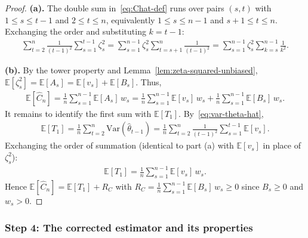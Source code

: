 \documentclass[11pt]{article}
\newcommand{\thetahat}{\hat{\theta}}
\newcommand{\Chat}{\hat{C}}
\newcommand{\Var}{\mathrm{Var}}
\begin{document}
\begin{proof}
    \textbf{(a).} The double sum in~\eqref{eq:Chat-def} runs over pairs $(s,t)$ with $1 \leq s \leq t-1$ and $2 \leq t \leq n$, equivalently $1 \leq s \leq n-1$ and $s+1 \leq t \leq n$. Exchanging the order and substituting $k = t-1$:
    \begin{align*}
        \sum_{t=2}^n \frac{1}{(t-1)^2}\sum_{s=1}^{t-1}\zeta_s^2 = \sum_{s=1}^{n-1}\zeta_s^2 \sum_{t=s+1}^{n}\frac{1}{(t-1)^2} = \sum_{s=1}^{n-1}\zeta_s^2 \sum_{k=s}^{n-1}\frac{1}{k^2}.
    \end{align*}

    \textbf{(b).} By the tower property and Lemma~\ref{lem:zeta-squared-unbiased}, $\mathbb{E}[\zeta_s^2] = \mathbb{E}[A_s] = \mathbb{E}[v_s] + \mathbb{E}[B_s]$. Thus,
    \begin{align*}
        \mathbb{E}[\Chat_n] = \frac{1}{n}\sum_{s=1}^{n-1}\mathbb{E}[A_s]\,w_s = \frac{1}{n}\sum_{s=1}^{n-1}\mathbb{E}[v_s]\,w_s + \frac{1}{n}\sum_{s=1}^{n-1}\mathbb{E}[B_s]\,w_s.
    \end{align*}
    It remains to identify the first sum with $\mathbb{E}[T_1]$. By~\eqref{eq:var-theta-hat},
    \begin{align*}
        \mathbb{E}[T_1] = \frac{1}{n}\sum_{t=2}^n \Var(\thetahat_{t-1}) = \frac{1}{n}\sum_{t=2}^n \frac{1}{(t-1)^2}\sum_{s=1}^{t-1}\mathbb{E}[v_s].
    \end{align*}
    Exchanging the order of summation (identical to part (a) with $\mathbb{E}[v_s]$ in place of $\zeta_s^2$):
    \begin{align*}
        \mathbb{E}[T_1] = \frac{1}{n}\sum_{s=1}^{n-1}\mathbb{E}[v_s]\,w_s.
    \end{align*}
    Hence $\mathbb{E}[\Chat_n] = \mathbb{E}[T_1] + R_C$ with $R_C = \frac{1}{n}\sum_{s=1}^{n-1}\mathbb{E}[B_s]\,w_s \geq 0$ since $B_s \geq 0$ and $w_s > 0$.
\end{proof}

\subsubsection*{Step 4: The corrected estimator and its properties}
\end{document}
